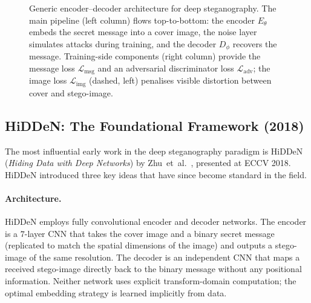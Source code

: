 \documentclass[12pt,a4paper,oneside]{report}
\begin{document}
\begin{figure}[htbp]
\begin{tikzpicture}
		\end{tikzpicture}
		\caption{Generic encoder--decoder architecture for deep steganography.
			The main pipeline (left column) flows top-to-bottom: the encoder
			$E_\theta$ embeds the secret message into a cover image, the noise
			layer simulates attacks during training, and the decoder $D_\phi$
			recovers the message. Training-side components (right column) provide
			the message loss $\mathcal{L}_\text{msg}$ and an adversarial
			discriminator loss $\mathcal{L}_\text{adv}$; the image loss
			$\mathcal{L}_\text{img}$ (dashed, left) penalises visible distortion
			between cover and stego-image.}
		\label{fig:encoder_decoder}
	\end{figure}
	
	\subsection{HiDDeN: The Foundational Framework (2018)}
	\label{subsec:hidden}
	
	The most influential early work in the deep steganography paradigm is HiDDeN
	(\textit{Hiding Data with Deep Networks}) by Zhu~et~al.\ \cite{zhu2018hidden}, presented at ECCV
	2018. HiDDeN introduced three key ideas that have since become standard in the field.
	
	\paragraph{Architecture.}
	HiDDeN employs fully convolutional encoder and decoder networks.  The encoder is a
	$7$-layer CNN that takes the cover image and a binary secret message (replicated to match the
	spatial dimensions of the image) and outputs a stego-image of the same resolution. The decoder
	is an independent CNN that maps a received stego-image directly back to the binary message
	without any positional information. Neither network uses explicit transform-domain computation;
	the optimal embedding strategy is learned implicitly from data.
	
\end{document}
